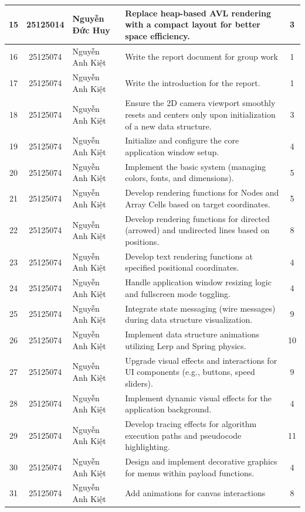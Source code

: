 \begin{center}
\begin{longtable}{|c|c|p{3.2cm}|p{6.5cm}|c|}
15 & 25125014 & Nguyễn Đức Huy & Replace heap-based AVL rendering with a compact layout for better space efficiency. & 3 \\ \hline
16 & 25125074 & Nguyễn Anh Kiệt & Write the report document for group work & 1 \\ \hline
17 & 25125074 & Nguyễn Anh Kiệt & Write the introduction for the report. & 1 \\ \hline
18 & 25125074 & Nguyễn Anh Kiệt & Ensure the 2D camera viewport smoothly resets and centers only upon initialization of a new data structure. & 3 \\ \hline
19 & 25125074 & Nguyễn Anh Kiệt & Initialize and configure the core application window setup. & 4 \\ \hline
20 & 25125074 & Nguyễn Anh Kiệt & Implement the basic system (managing colors, fonts, and dimensions). & 5 \\ \hline
21 & 25125074 & Nguyễn Anh Kiệt & Develop rendering functions for Nodes and Array Cells based on target coordinates. & 5 \\ \hline
22 & 25125074 & Nguyễn Anh Kiệt & Develop rendering functions for directed (arrowed) and undirected lines based on positions. & 8 \\ \hline
23 & 25125074 & Nguyễn Anh Kiệt & Develop text rendering functions at specified positional coordinates. & 4 \\ \hline
24 & 25125074 & Nguyễn Anh Kiệt & Handle application window resizing logic and fullscreen mode toggling. & 4 \\ \hline
25 & 25125074 & Nguyễn Anh Kiệt & Integrate state messaging (wire messages) during data structure visualization. & 9 \\ \hline
26 & 25125074 & Nguyễn Anh Kiệt & Implement data structure animations utilizing Lerp and Spring physics. & 10 \\ \hline
27 & 25125074 & Nguyễn Anh Kiệt & Upgrade visual effects and interactions for UI components (e.g., buttons, speed sliders). & 9 \\ \hline
28 & 25125074 & Nguyễn Anh Kiệt & Implement dynamic visual effects for the application background. & 4 \\ \hline
29 & 25125074 & Nguyễn Anh Kiệt & Develop tracing effects for algorithm execution paths and pseudocode highlighting. & 11 \\ \hline
30 & 25125074 & Nguyễn Anh Kiệt & Design and implement decorative graphics for menus within payload functions. & 4 \\ \hline
31 & 25125074 & Nguyễn Anh Kiệt & Add animations for canvas interactions & 8 \\ \hline

\end{longtable}
\end{center}

